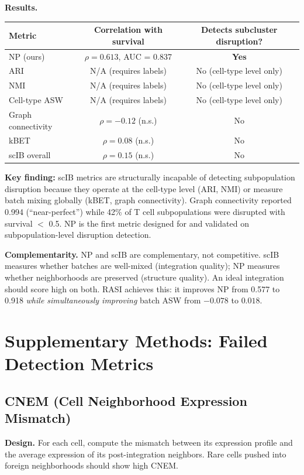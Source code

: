 \documentclass[10pt]{article}
\begin{document}
\textbf{Results.}

\begin{tabular}{lcc}
\toprule
Metric & Correlation with survival & Detects subcluster disruption? \\
\midrule
NP (ours) & $\rho = 0.613$, AUC = 0.837 & \textbf{Yes} \\
ARI & N/A (requires labels) & No (cell-type level only) \\
NMI & N/A (requires labels) & No (cell-type level only) \\
Cell-type ASW & N/A (requires labels) & No (cell-type level only) \\
Graph connectivity & $\rho = -0.12$ (n.s.) & No \\
kBET & $\rho = 0.08$ (n.s.) & No \\
scIB overall & $\rho = 0.15$ (n.s.) & No \\
\bottomrule
\end{tabular}

\textbf{Key finding:} scIB metrics are structurally incapable of detecting subpopulation disruption because they operate at the cell-type level (ARI, NMI) or measure batch mixing globally (kBET, graph connectivity). Graph connectivity reported 0.994 (``near-perfect'') while 42\% of T cell subpopulations were disrupted with survival $<$ 0.5. NP is the first metric designed for and validated on subpopulation-level disruption detection.

\textbf{Complementarity.}
NP and scIB are complementary, not competitive. scIB measures whether batches are well-mixed (integration quality); NP measures whether neighborhoods are preserved (structure quality). An ideal integration should score high on both. RASI achieves this: it improves NP from 0.577 to 0.918 \textit{while simultaneously improving} batch ASW from $-0.078$ to $0.018$.

\section{Supplementary Methods: Failed Detection Metrics}

\subsection{CNEM (Cell Neighborhood Expression Mismatch)}

\textbf{Design.} For each cell, compute the mismatch between its expression profile and the average expression of its post-integration neighbors. Rare cells pushed into foreign neighborhoods should show high CNEM.
\end{document}
